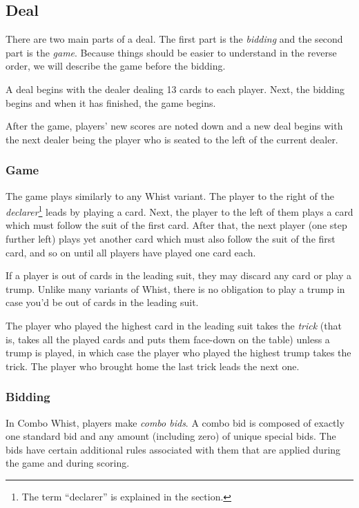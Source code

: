 \documentclass[a4paper]{article}
\begin{document}
		\subsection{Deal}
			There are two main parts of a deal. The first part is the \emph{bidding} and the second part is the \emph{game}. Because things should be easier to understand in the reverse order, we will describe the game before the bidding.

			A deal begins with the dealer dealing 13 cards to each player. Next, the bidding begins and when it has finished, the game begins.

			After the game, players' new scores are noted down and a new deal begins with the next dealer being the player who is seated to the left of the current dealer.

			\subsubsection{Game}
				The game plays similarly to any Whist variant. The player to the right of the \emph{declarer}\footnote{The term ``declarer'' is explained in the \textit{} section.} leads by playing a card. Next, the player to the left of them plays a card which must follow the suit of the first card. After that, the next player (one step further left) plays yet another card which must also follow the suit of the first card, and so on until all players have played one card each.

				If a player is out of cards in the leading suit, they may discard any card or play a trump. Unlike many variants of Whist, there is no obligation to play a trump in case you'd be out of cards in the leading suit.

				The player who played the highest card in the leading suit takes the \emph{trick} (that is, takes all the played cards and puts them face-down on the table) unless a trump is played, in which case the player who played the highest trump takes the trick. The player who brought home the last trick leads the next one.

			\subsubsection{Bidding}
				\label{sec:bidding}
				In Combo Whist, players make \emph{combo bids}. A combo bid is composed of exactly one standard bid and any amount (including zero) of unique special bids. The bids have certain additional rules associated with them that are applied during the game and during scoring.
\end{document}
